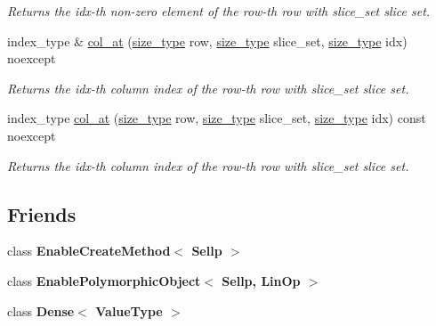 \begin{DoxyCompactItemize}
\begin{DoxyCompactList}\small\item\em Returns the {\ttfamily idx}-\/th non-\/zero element of the {\ttfamily row}-\/th row with {\ttfamily slice\+\_\+set} slice set. \end{DoxyCompactList}\item 
index\+\_\+type \& \hyperlink{classgko_1_1matrix_1_1Sellp_a994af14832dbc9ff70e431f6c11a1d52}{col\+\_\+at} (\hyperlink{namespacegko_a6e5c95df0ae4e47aab2f604a22d98ee7}{size\+\_\+type} row, \hyperlink{namespacegko_a6e5c95df0ae4e47aab2f604a22d98ee7}{size\+\_\+type} slice\+\_\+set, \hyperlink{namespacegko_a6e5c95df0ae4e47aab2f604a22d98ee7}{size\+\_\+type} idx) noexcept
\begin{DoxyCompactList}\small\item\em Returns the {\ttfamily idx}-\/th column index of the {\ttfamily row}-\/th row with {\ttfamily slice\+\_\+set} slice set. \end{DoxyCompactList}\item 
index\+\_\+type \hyperlink{classgko_1_1matrix_1_1Sellp_a5fb397d1dc15063dc4dc78bb9d9b4f72}{col\+\_\+at} (\hyperlink{namespacegko_a6e5c95df0ae4e47aab2f604a22d98ee7}{size\+\_\+type} row, \hyperlink{namespacegko_a6e5c95df0ae4e47aab2f604a22d98ee7}{size\+\_\+type} slice\+\_\+set, \hyperlink{namespacegko_a6e5c95df0ae4e47aab2f604a22d98ee7}{size\+\_\+type} idx) const noexcept
\begin{DoxyCompactList}\small\item\em Returns the {\ttfamily idx}-\/th column index of the {\ttfamily row}-\/th row with {\ttfamily slice\+\_\+set} slice set. \end{DoxyCompactList}\end{DoxyCompactItemize}
\subsection*{Friends}
\begin{DoxyCompactItemize}
\item 
\mbox{\label{classgko_1_1matrix_1_1Sellp_a6dcfab4b2f117cf840ccbd963f2f5083}} 
class {\bfseries Enable\+Create\+Method$<$ Sellp $>$}
\item 
\mbox{\label{classgko_1_1matrix_1_1Sellp_a9f42518ddcbd7efd8347113f4184667d}} 
class {\bfseries Enable\+Polymorphic\+Object$<$ Sellp, Lin\+Op $>$}
\item 
\mbox{\label{classgko_1_1matrix_1_1Sellp_a22a84c8f67f946aa60a2fa8bf5835a32}} 
class {\bfseries Dense$<$ Value\+Type $>$}
\end{DoxyCompactItemize}
